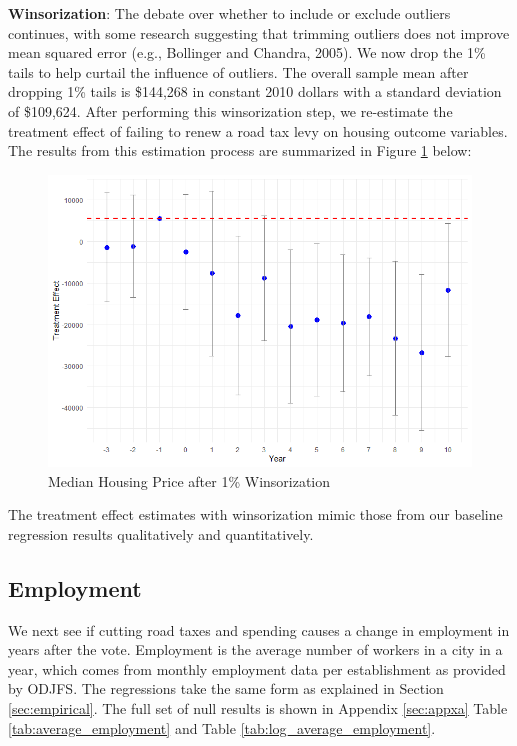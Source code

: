 \textbf{Winsorization}: The debate over whether to include or exclude outliers continues, with some research suggesting that trimming outliers does not improve mean squared error (e.g., Bollinger and Chandra, 2005).  We now drop the 1\% tails to help curtail the influence of outliers. The overall sample mean after dropping 1\% tails is \$144,268 in constant 2010 dollars with a standard deviation of \$109,624. After performing this winsorization step, we re-estimate the treatment effect of failing to renew a road tax levy on housing outcome variables. The results from this estimation process are summarized in Figure \ref{fig:tes_g_w} below:

\begin{figure}[htbp]
    \centering
    \includegraphics[width=\textwidth,keepaspectratio]{images/tes_g_w_re.png}    
    \caption{Median Housing Price after 1\% Winsorization}
    \label{fig:tes_g_w}
\end{figure}

The treatment effect estimates with winsorization mimic those from our baseline regression results qualitatively and quantitatively.

\subsection{Employment} \label{sec:employment}

We next see if cutting road taxes and spending causes a change in employment in years after the vote. Employment is the average number of workers in a city in a year, which comes from monthly employment data per establishment as provided by ODJFS.  The regressions take the same form as explained in Section \ref{sec:empirical}.  The full set of null results is shown in Appendix \ref{sec:appxa} Table \ref{tab:average_employment} and Table \ref{tab:log_average_employment}.

